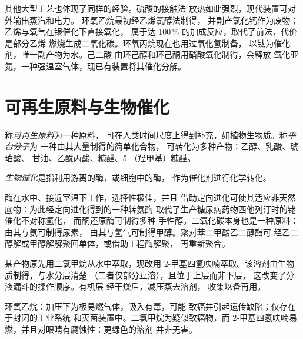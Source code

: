 其他大型工艺也体现了同样的经验。硫酸的接触法
放热如此强烈，现代装置可对外输出蒸汽和电力。
环氧乙烷最初经乙烯氯醇法制得，
并副产氯化钙作为废物；乙烯与氧气在银催化下直接氧化，
属于达 100\,\% 的加成反应，取代了前法，代价是部分乙烯
燃烧生成二氧化碳。环氧丙烷现在也用过氧化氢制备，
以钛为催化剂，唯一副产物为水。己二酸
由环己醇和环己酮用硝酸氧化制得，会释放
氧化亚氮，一种强温室气体，现已有装置将其催化分解。

\section{可再生原料与生物催化}

\begin{definition}[可再生原料]\label{def:b3:green-industrial:feedstock}
称\emph{可再生原料}为一种原料，
可在人类时间尺度上得到补充，如植物生物质。称\emph{平台分子}为
一种由其大量制得的简单化合物，
可转化为多种产物：乙醇、乳酸、琥珀酸、
甘油、乙酰丙酸、糠醛、5-（羟甲基）糠醛。
\end{definition}

\begin{definition}[生物催化]\label{def:b3:green-industrial:biocatalysis}
\emph{生物催化}是指利用游离的酶，或细胞中的酶，
作为催化剂进行化学转化。
\end{definition}

酶在水中、接近室温下工作，选择性极佳，并且
借助定向进化可使其适应非天然底物：为此经定向进化得到的一种转氨酶
取代了生产糖尿病药物西他列汀时的铑催化不对称氢化，
而酮还原酶可制得多种
手性醇。二氧化碳本身也是一种原料：由其与氨可制得尿素，
由其与氢气可制得甲醇。聚对苯二甲酸乙二醇酯可
经乙二醇解或甲醇解解聚回单体，或借助工程酶解聚，
再重新聚合。

\begin{inthelab}[后处理中替换二氯甲烷]
某产物原先用二氯甲烷从水中萃取，现改用
2-甲基四氢呋喃萃取。该溶剂由生物质制得，与水分层清楚
（二者仅部分互溶），且位于上层而非下层，
这改变了分液漏斗的操作顺序。有机层
经干燥后，减压蒸去溶剂，
收集以备再用。
\end{inthelab}

\begin{safety}{}
环氧乙烷：加压下为极易燃气体，吸入有毒，可能
致癌并引起遗传缺陷；仅存在于封闭的工业系统
和灭菌装置中。二氯甲烷为疑似致癌物，而
2-甲基四氢呋喃易燃，并且对眼睛有腐蚀性：更绿色的溶剂
并非无害。
\end{safety}

